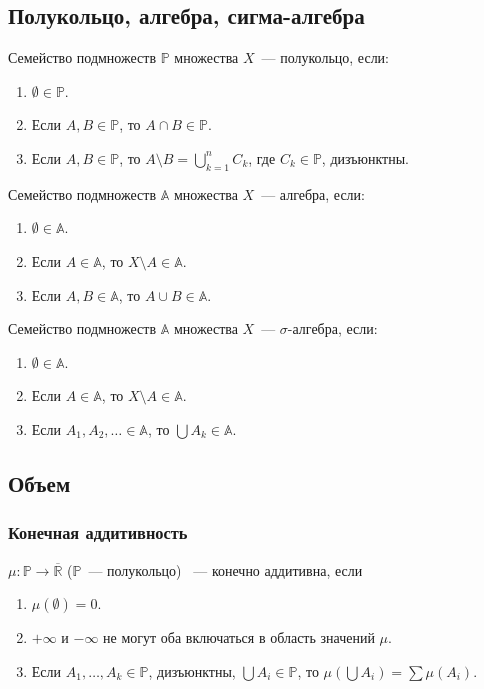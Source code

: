 \documentclass[paper=a4, fontsize=11pt]{article}
\begin{document}
\subsection{Полукольцо, алгебра, сигма-алгебра}
Семейство подмножеств $\mathds{P}$ множества $X$~--- полукольцо, если:
\begin{enumerate}
    \item $\emptyset \in \mathds{P}$.
    \item Если $A,B \in \mathds{P}$, то $A \cap B \in \mathds{P}$.
    \item Если $A,B \in \mathds{P}$, то $A \setminus B = \bigcup_{k=1}^{n} C_k$, где $C_k \in \mathds{P}$, дизъюнктны.
\end{enumerate}

Семейство подмножеств $\mathds{A}$ множества $X$~--- алгебра, если:
\begin{enumerate}
    \item $\emptyset \in \mathds{A}$.
    \item Если $A \in \mathds{A}$, то $X \setminus A \in \mathds{A}$.
    \item Если $A,B \in \mathds{A}$, то $A \cup B \in \mathds{A}$.
\end{enumerate}

Семейство подмножеств $\mathds{A}$ множества $X$~--- $\sigma$-алгебра, если:
\begin{enumerate}
    \item $\emptyset \in \mathds{A}$.
    \item Если $A \in \mathds{A}$, то $X \setminus A \in \mathds{A}$.
    \item Если $A_1,A_2,\dots \in \mathds{A}$, то $\bigcup A_k \in \mathds{A}$.
\end{enumerate}

\subsection{Объем}
\subsubsection{Конечная аддитивность}
$\mu: \mathds{P} \rightarrow \overline{\mathds{R}}$ ($\mathds{P}$~--- полукольцо) ~--- конечно аддитивна, если
\begin{enumerate}
    \item $\mu(\emptyset)=0$.
    \item $+\infty$ и $-\infty$ не могут оба включаться в область значений $\mu$.
    \item Если $A_1,\dots,A_k \in \mathds{P}$, дизъюнктны, $\bigcup A_i \in \mathds{P}$, то $\mu(\bigcup A_i) = \sum \mu(A_i)$.
\end{enumerate}
\end{document}
